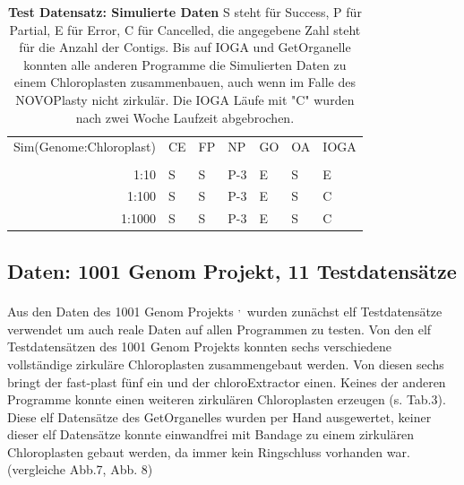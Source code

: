 \documentclass{scrartcl}
\begin{document}
\begin{table}[!h]
\caption[Test Datensatz: Simulierte Daten]{\textbf{Test Datensatz: Simulierte Daten} S steht für Success, P für Partial, E für Error, C für Cancelled, die angegebene Zahl steht für die Anzahl der Contigs. Bis auf IOGA und GetOrganelle konnten alle anderen Programme die Simulierten Daten zu einem Chloroplasten zusammenbauen, auch wenn im Falle des NOVOPlasty nicht zirkulär. Die IOGA Läufe mit "C" wurden nach zwei Woche Laufzeit abgebrochen.}
\begin{center}
\begin{tabular}{rllllll}
Sim(Genome:Chloroplast) & CE & FP & NP & GO & OA & IOGA\\
 &  &  &  &  &  & \\
\hline
1:10 & S & S & P-3 & E & S & E\\
1:100 & S & S & P-3 & E & S & C\\
1:1000 & S & S & P-3 & E & S & C\\
\end{tabular}
\end{center}
\end{table}

\subsection{Daten: 1001 Genom Projekt, 11 Testdatensätze}
\label{sec-4-3}
Aus den Daten des 1001 Genom Projekts \footnotemark[46]{}\textsuperscript{,}\,\footnotemark[7]{} wurden zunächst elf Testdatensätze verwendet um auch reale Daten auf allen Programmen zu testen.
Von den elf Testdatensätzen des 1001 Genom Projekts konnten sechs verschiedene vollständige zirkuläre Chloroplasten zusammengebaut werden. Von diesen
sechs bringt der fast-plast fünf ein und der chloroExtractor einen. Keines der anderen Programme konnte einen weiteren 
zirkulären Chloroplasten erzeugen (s. Tab.3). Diese elf Datensätze des GetOrganelles wurden per Hand ausgewertet, keiner dieser elf Datensätze konnte einwandfrei mit Bandage
zu einem zirkulären Chloroplasten gebaut werden, da immer kein Ringschluss vorhanden war. (vergleiche Abb.7, Abb. 8)
\end{document}
